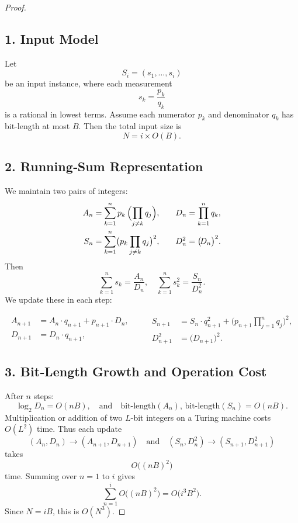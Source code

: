 \documentclass[12pt]{article}
\theoremstyle{definition}
\begin{document}
\begin{proof}

\subsection*{1. Input Model}

Let
\[
S_i = (s_1,\dots,s_i)
\]
be an input instance, where each measurement
\[
s_k = \frac{p_k}{q_k}
\]
is a rational in lowest terms.  Assume each numerator \(p_k\) and denominator \(q_k\) has bit‐length at most \(B\).  Then the total input size is
\[
N = i \times O(B).
\]

\subsection*{2. Running‐Sum Representation}

We maintain two pairs of integers:
\[
\begin{aligned}
A_n &= \sum_{k=1}^n p_k \,\Bigl(\prod_{j\neq k} q_j\Bigr),
&\quad
D_n &= \prod_{k=1}^n q_k,\\
S_n &= \sum_{k=1}^n \bigl(p_k\prod_{j\neq k} q_j\bigr)^2,
&\quad
D_n^2 &= \bigl(\!D_n\bigr)^2.
\end{aligned}
\]
Then
\[
\sum_{k=1}^n s_k = \frac{A_n}{D_n},
\quad
\sum_{k=1}^n s_k^2 = \frac{S_n}{D_n^2}.
\]
We update these in each step:

\[
\begin{aligned}
A_{n+1} &= A_n\cdot q_{n+1} + p_{n+1}\cdot D_n,\\
D_{n+1} &= D_n\cdot q_{n+1},
\end{aligned}
\qquad
\begin{aligned}
S_{n+1} &= S_n\cdot q_{n+1}^2 + \bigl(p_{n+1}\prod_{j=1}^{n}q_j\bigr)^2,\\
D_{n+1}^2 &= \bigl(D_{n+1}\bigr)^2.
\end{aligned}
\]

\subsection*{3. Bit‐Length Growth and Operation Cost}

After \(n\) steps:
\[
\log_2 D_n = O(nB),
\quad
\text{and}\quad
\text{bit‐length}(A_n),\,\text{bit‐length}(S_n) = O(nB).
\]
Multiplication or addition of two \(L\)-bit integers on a Turing machine costs \(O(L^2)\) time.  Thus each update
\[
(A_n,D_n)\to(A_{n+1},D_{n+1})
\quad\text{and}\quad
(S_n,D_n^2)\to(S_{n+1},D_{n+1}^2)
\]
takes 
\[
O\bigl((nB)^2\bigr)
\]
time.  Summing over \(n=1\) to \(i\) gives
\[
\sum_{n=1}^i O\bigl((nB)^2\bigr)
= O\bigl(i^3B^2\bigr).
\]
Since \(N = iB\), this is \(O(N^3)\).


\end{proof}
\end{document}
